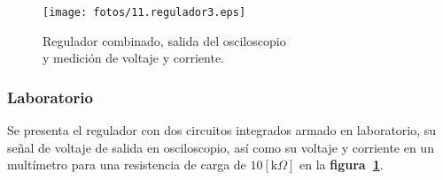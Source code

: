 \begin{figure}[!h]
\centering
\texttt{[image: fotos/11.regulador3.eps]}
\caption{Regulador combinado, salida del osciloscopio\\
y medición de voltaje y corriente.}
\label{laboratorio13}
\end{figure}

\subsubsection{Laboratorio}
Se presenta el regulador con dos circuitos integrados armado en laboratorio, su
señal de voltaje de salida en osciloscopio, así como su voltaje y corriente en
un multímetro para una resistencia de carga de $10[\text{k}\Omega]$ en la
\textbf{figura~\ref{laboratorio13}}.

